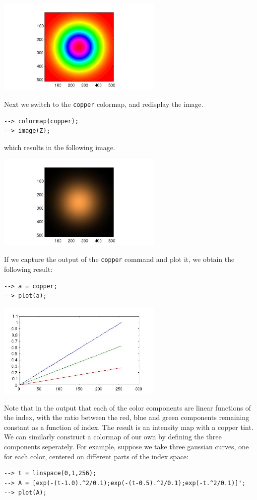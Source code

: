 \centerline{\includegraphics[width=8cm]{colormap1}}


Next we switch to the \verb|copper| colormap, and redisplay the image.
\begin{verbatim}
--> colormap(copper);
--> image(Z);
\end{verbatim}
which results in the following image.


\centerline{\includegraphics[width=8cm]{colormap2}}


If we capture the output of the \verb|copper| command and plot it, we obtain
the following result:
\begin{verbatim}
--> a = copper;
--> plot(a);
\end{verbatim}


\centerline{\includegraphics[width=8cm]{colormap3}}


Note that in the output that each of the color components are linear functions
of the index, with the ratio between the red, blue and green components remaining
constant as a function of index.  The result is an intensity map with a copper
tint.  We can similarly construct a colormap of our own by defining the 
three components seperately.  For example, suppose we take three gaussian
curves, one for each color, centered on different parts of the index space:
\begin{verbatim}
--> t = linspace(0,1,256);
--> A = [exp(-(t-1.0).^2/0.1);exp(-(t-0.5).^2/0.1);exp(-t.^2/0.1)]';
--> plot(A);
\end{verbatim}


